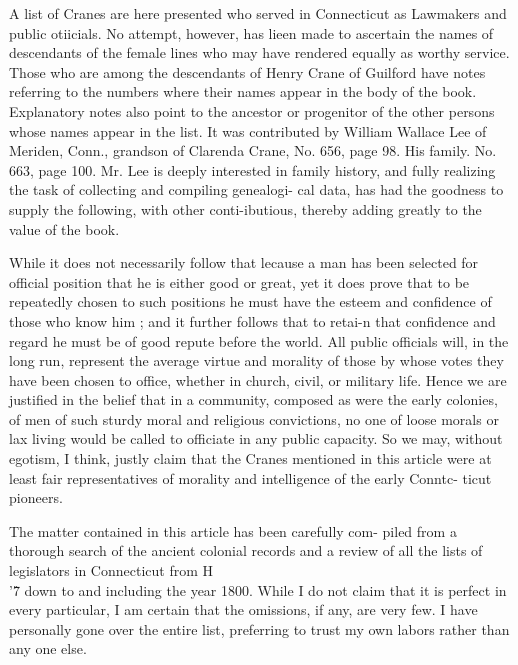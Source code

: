 \documentclass{book}
\begin{document}
A list of Cranes are here presented who served in Connecticut 
as Lawmakers and public otiicials. No attempt, however, has 
lieen made to ascertain the names of descendants of the female 
lines who may have rendered equally as worthy service. Those 
who are among the descendants of Henry Crane of Guilford have 
notes referring to the numbers where their names appear in the 
body of the book. Explanatory notes also point to the ancestor 
or progenitor of the other persons whose names appear in the list. 
It was contributed by William Wallace Lee of Meriden, Conn., 
grandson of Clarenda Crane, No. 656, page 98. His family. No. 
663, page 100. Mr. Lee is deeply interested in family history, 
and fully realizing the task of collecting and compiling genealogi- 
cal data, has had the goodness to supply the following, with other 
conti-ibutious, thereby adding greatly to the value of the book. 



While it does not necessarily follow that lecause a man has 
been selected for official position that he is either good or great, 
yet it does prove that to be repeatedly chosen to such positions 
he must have the esteem and confidence of those who know him ; 
and it further follows that to retai-n that confidence and regard 
he must be of good repute before the world. All public officials 
will, in the long run, represent the average virtue and morality 
of those by whose votes they have been chosen to office, whether 
in church, civil, or military life. Hence we are justified in the 
belief that in a community, composed as were the early colonies, 
of men of such sturdy moral and religious convictions, no one of 
loose morals or lax living would be called to officiate in any 
public capacity. So we may, without egotism, I think, justly 
claim that the Cranes mentioned in this article were at least fair 
representatives of morality and intelligence of the early Conntc- 
ticut pioneers. 

The matter contained in this article has been carefully com- 
piled from a thorough search of the ancient colonial records and 
a review of all the lists of legislators in Connecticut from H\\'\^7 
down to and including the year 1800. While I do not claim that 
it is perfect in every particular, I am certain that the omissions, 
if any, are very few. I have personally gone over the entire list, 
preferring to trust my own labors rather than any one else. 
\end{document}
